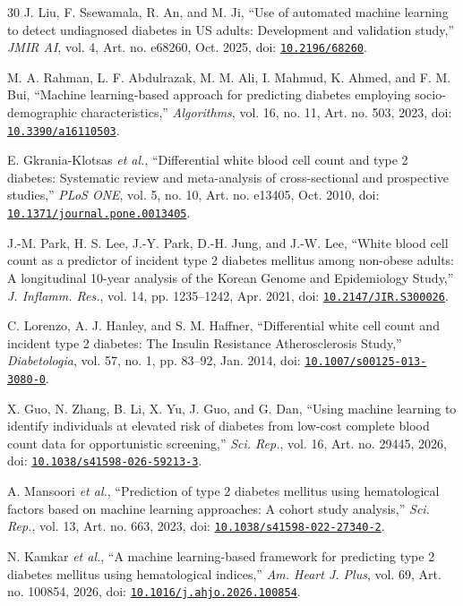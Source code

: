 \documentclass[conference]{IEEEtran}
\newcommand{\doi}[1]{\href{https://doi.org/#1}{\nolinkurl{#1}}}
\begin{document}
\begin{thebibliography}{30}
J. Liu, F. Ssewamala, R. An, and M. Ji, ``Use of automated machine learning to detect undiagnosed diabetes in US adults: Development and validation study,'' \emph{JMIR AI}, vol. 4, Art. no. e68260, Oct. 2025, doi: \doi{10.2196/68260}.

M. A. Rahman, L. F. Abdulrazak, M. M. Ali, I. Mahmud, K. Ahmed, and F. M. Bui, ``Machine learning-based approach for predicting diabetes employing socio-demographic characteristics,'' \emph{Algorithms}, vol. 16, no. 11, Art. no. 503, 2023, doi: \doi{10.3390/a16110503}.

E. Gkrania-Klotsas \emph{et al.}, ``Differential white blood cell count and type 2 diabetes: Systematic review and meta-analysis of cross-sectional and prospective studies,'' \emph{PLoS ONE}, vol. 5, no. 10, Art. no. e13405, Oct. 2010, doi: \doi{10.1371/journal.pone.0013405}.

J.-M. Park, H. S. Lee, J.-Y. Park, D.-H. Jung, and J.-W. Lee, ``White blood cell count as a predictor of incident type 2 diabetes mellitus among non-obese adults: A longitudinal 10-year analysis of the Korean Genome and Epidemiology Study,'' \emph{J. Inflamm. Res.}, vol. 14, pp. 1235--1242, Apr. 2021, doi: \doi{10.2147/JIR.S300026}.

C. Lorenzo, A. J. Hanley, and S. M. Haffner, ``Differential white cell count and incident type 2 diabetes: The Insulin Resistance Atherosclerosis Study,'' \emph{Diabetologia}, vol. 57, no. 1, pp. 83--92, Jan. 2014, doi: \doi{10.1007/s00125-013-3080-0}.

X. Guo, N. Zhang, B. Li, X. Yu, J. Guo, and G. Dan, ``Using machine learning to identify individuals at elevated risk of diabetes from low-cost complete blood count data for opportunistic screening,'' \emph{Sci. Rep.}, vol. 16, Art. no. 29445, 2026, doi: \doi{10.1038/s41598-026-59213-3}.

A. Mansoori \emph{et al.}, ``Prediction of type 2 diabetes mellitus using hematological factors based on machine learning approaches: A cohort study analysis,'' \emph{Sci. Rep.}, vol. 13, Art. no. 663, 2023, doi: \doi{10.1038/s41598-022-27340-2}.

N. Kamkar \emph{et al.}, ``A machine learning-based framework for predicting type 2 diabetes mellitus using hematological indices,'' \emph{Am. Heart J. Plus}, vol. 69, Art. no. 100854, 2026, doi: \doi{10.1016/j.ahjo.2026.100854}.


\end{thebibliography}
\end{document}
